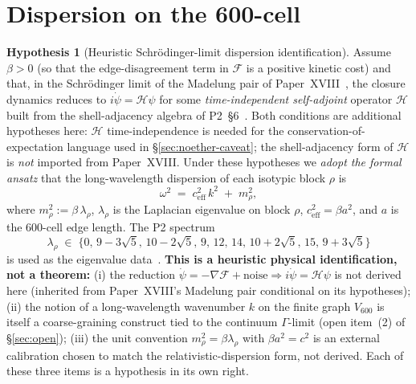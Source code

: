 \documentclass[11pt]{article}
\theoremstyle{definition}
\newtheorem{hypothesis}[theorem]{Hypothesis}
\newcommand{\Fcal}{\mathcal{F}}
\newcommand{\Hcal}{\mathcal{H}}
\begin{document}
\section{Dispersion on the 600-cell}\label{sec:dispersion}

\begin{hypothesis}[Heuristic Schr\"{o}dinger-limit dispersion identification]\label{prop:dispersion}
Assume $\beta > 0$ (so that the edge-disagreement term in $\Fcal$ is a positive kinetic cost) and that, in the Schr\"{o}dinger limit of the Madelung pair of Paper~XVIII~\citep{SmartXVIII}, the closure dynamics reduces to $i\dot\psi = \Hcal\psi$ for some \emph{time-independent self-adjoint} operator $\Hcal$ built from the shell-adjacency algebra of P2~\S 6~\citep{CascadeAlgSubstrate}. Both conditions are additional hypotheses here: $\Hcal$ time-independence is needed for the conservation-of-expectation language used in \S\ref{sec:noether-caveat}; the shell-adjacency form of $\Hcal$ is \emph{not} imported from Paper~XVIII. Under these hypotheses we \emph{adopt the formal ansatz} that the long-wavelength dispersion of each isotypic block $\rho$ is
\begin{equation}\label{eq:dispersion}
    \omega^2 \;=\; c_{\text{eff}}^2 \, k^2 \;+\; m_\rho^2,
\end{equation}
where $m_\rho^2 := \beta\,\lambda_\rho$, $\lambda_\rho$ is the Laplacian eigenvalue on block $\rho$, $c_{\text{eff}}^2 = \beta a^2$, and $a$ is the $600$-cell edge length. The P2 spectrum
\[
    \lambda_\rho \;\in\; \{0,\,9-3\sqrt 5,\,10-2\sqrt 5,\,9,\,12,\,14,\,10+2\sqrt 5,\,15,\,9+3\sqrt 5\}
\]
is used as the eigenvalue data~\citep{CascadeAlgSubstrate}. \textbf{This is a heuristic physical identification, not a theorem:} (i) the reduction $\dot\psi = -\nabla\Fcal + \text{noise} \Rightarrow i\dot\psi = \Hcal\psi$ is not derived here (inherited from Paper~XVIII's Madelung pair conditional on its hypotheses); (ii) the notion of a long-wavelength wavenumber $k$ on the finite graph $V_{600}$ is itself a coarse-graining construct tied to the continuum $\Gamma$-limit (open item~(2) of \S\ref{sec:open}); (iii) the unit convention $m_\rho^2 = \beta\lambda_\rho$ with $\beta a^2 = c^2$ is an external calibration chosen to match the relativistic-dispersion form, not derived. Each of these three items is a hypothesis in its own right.
\end{hypothesis}
\end{document}
